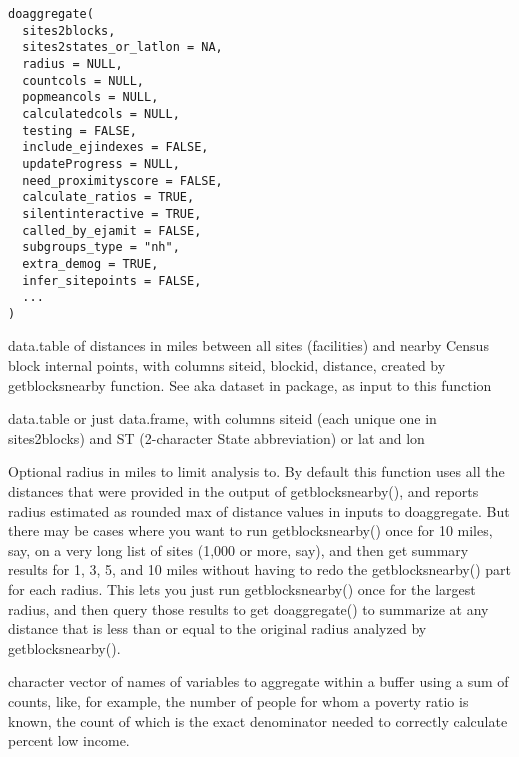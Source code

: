 \documentclass[a4paper]{book}
\begin{document}
%
\begin{Usage}
\begin{verbatim}
doaggregate(
  sites2blocks,
  sites2states_or_latlon = NA,
  radius = NULL,
  countcols = NULL,
  popmeancols = NULL,
  calculatedcols = NULL,
  testing = FALSE,
  include_ejindexes = FALSE,
  updateProgress = NULL,
  need_proximityscore = FALSE,
  calculate_ratios = TRUE,
  silentinteractive = TRUE,
  called_by_ejamit = FALSE,
  subgroups_type = "nh",
  extra_demog = TRUE,
  infer_sitepoints = FALSE,
  ...
)
\end{verbatim}
\end{Usage}
%
\begin{Arguments}
\begin{ldescription}
\item[\code{sites2blocks}] data.table of distances in miles between all sites (facilities) and
nearby Census block internal points, with columns siteid, blockid, distance,
created by getblocksnearby  function.
See  aka  dataset in package, as input to this function

\item[\code{sites2states\_or\_latlon}] data.table or just data.frame, with columns siteid (each unique one in sites2blocks) and ST (2-character State abbreviation) or lat and lon

\item[\code{radius}] Optional radius in miles to limit analysis to. By default this function uses
all the distances that were provided in the output of getblocksnearby(),
and reports radius estimated as rounded max of distance values in inputs to doaggregate.
But there may be cases where you want to run getblocksnearby() once for 10 miles, say,
on a very long list of sites (1,000 or more, say), and then get summary results for
1, 3, 5, and 10 miles without having to redo the getblocksnearby() part for each radius.
This lets you just run getblocksnearby() once for the largest radius, and then query those
results to get doaggregate() to summarize at any distance that is less than or equal to the
original radius analyzed by getblocksnearby().

\item[\code{countcols}] character vector of names of variables  to aggregate within a buffer
using a sum of counts, like, for example, the number of people for whom a
poverty ratio is known, the count of which is the exact denominator needed
to correctly calculate percent low income.


\end{ldescription}
\end{Arguments}
\end{document}
